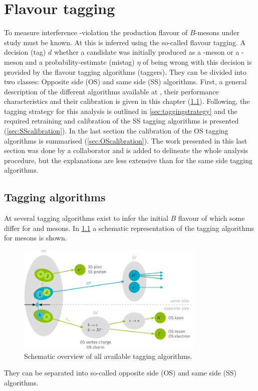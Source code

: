\chapter{Flavour tagging}
\label{ch:flavourtagging}

\linespread{1.08}\selectfont
To measure interference \CP-violation the production flavour of $B$-mesons under study must be known.
At \lhcb this is inferred using the so-called flavour tagging.
A decision (tag) $d$ whether a \B candidate was initially produced as a \Bz-meson or a \Bzb-meson and a probability-estimate (mistag) $\eta$ of being wrong with this decision is provided by the flavour tagging algorithms (taggers).
They can be divided into two classes: Opposite side (OS) and same side (SS) algorithms.
First, a general description of the different algorithms available at \lhcb, their performance characteristics and their calibration is given in this chapter (\cref{sec:taggingalgorithms}).
Following, the tagging strategy for this analysis is outlined in \cref{sec:taggingstrategy} and the required retraining and calibration of the SS tagging algorithms is presented (\cref{sec:SScalibration}).
In the last section the calibration of the OS tagging algorithms is summarised (\cref{sec:OScalibration}).
The work presented in this last section was done by a collaborator and is added to delineate the whole analysis procedure, but the explanations are less extensive than for the same side tagging algorithms.


\section{Tagging algorithms}
\label{sec:taggingalgorithms}

At \lhcb several tagging algorithms exist to infer the initial $B$ flavour of which some differ for \Bz and \Bs mesons.
In \cref{fig:taggingalgorithms} a schematic representation of the tagging algorithms for \Bz mesons is shown.
\begin{figure}[tbp]
    \centering
    \includegraphics[width=0.8\textwidth]{08FlavourTagging/figs/FTscheme.pdf}
    \caption{Schematic overview of all available \Bz tagging algorithms.}
    \label{fig:taggingalgorithms}
\end{figure}
They can be separated into so-called opposite side (OS) and same side (SS) algorithms.

